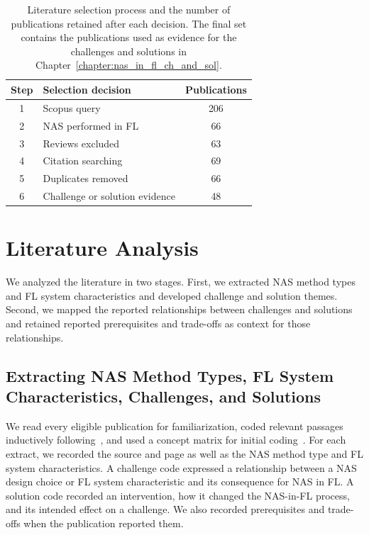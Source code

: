 \begin{table}[htbp]
    \centering
    \caption{Literature selection process and the number of publications retained after each decision. The final set contains the publications used as evidence for the challenges and solutions in Chapter~\ref{chapter:nas_in_fl_ch_and_sol}.}
    \label{table:literature-selection}
    \begin{tabular}{@{}clc@{}}
        \toprule
        \textbf{Step} & \textbf{Selection decision} & \textbf{Publications} \\
        \midrule
        1 & Scopus query & 206 \\
        2 & NAS performed in FL & 66 \\
        3 & Reviews excluded & 63 \\
        4 & Citation searching & 69 \\
        5 & Duplicates removed & 66 \\
        6 & Challenge or solution evidence & 48 \\
        \bottomrule
    \end{tabular}
\end{table}

\section{Literature Analysis}

We analyzed the literature in two stages. First, we extracted NAS method types and FL system characteristics and developed challenge and solution themes. Second, we mapped the reported relationships between challenges and solutions and retained reported prerequisites and trade-offs as context for those relationships.

\subsection{Extracting NAS Method Types, FL System Characteristics, Challenges, and Solutions}

We read every eligible publication for familiarization, coded relevant passages inductively following~\cite{using_thematic_analysis_2006}, and used a concept matrix for initial coding~\cite{webster_watson_literature_review_2002}. For each extract, we recorded the source and page as well as the NAS method type and FL system characteristics. A challenge code expressed a relationship between a NAS design choice or FL system characteristic and its consequence for NAS in FL. A solution code recorded an intervention, how it changed the NAS-in-FL process, and its intended effect on a challenge. We also recorded prerequisites and trade-offs when the publication reported them.

